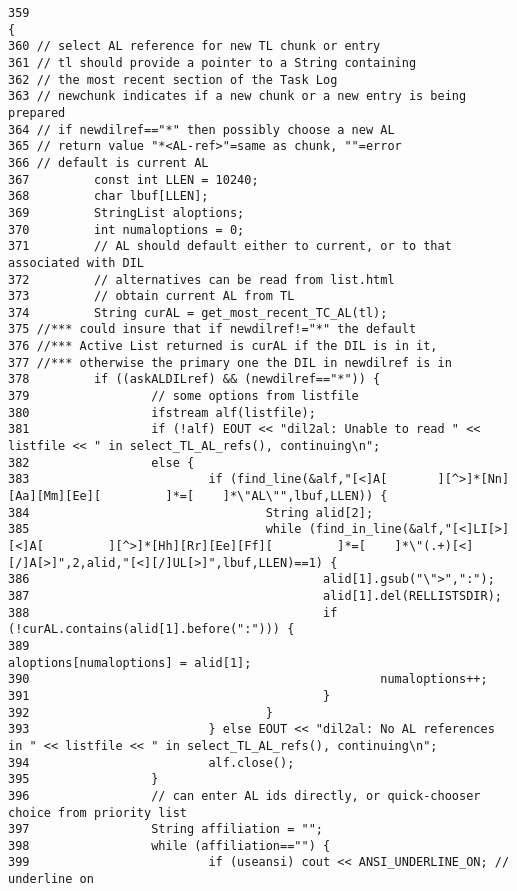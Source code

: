 \footnotesize\begin{verbatim}359                                                                        {
360 // select AL reference for new TL chunk or entry
361 // tl should provide a pointer to a String containing
362 // the most recent section of the Task Log
363 // newchunk indicates if a new chunk or a new entry is being prepared
364 // if newdilref=="*" then possibly choose a new AL
365 // return value "*<AL-ref>"=same as chunk, ""=error
366 // default is current AL
367         const int LLEN = 10240;
368         char lbuf[LLEN];
369         StringList aloptions;
370         int numaloptions = 0;
371         // AL should default either to current, or to that associated with DIL
372         // alternatives can be read from list.html
373         // obtain current AL from TL
374         String curAL = get_most_recent_TC_AL(tl);
375 //*** could insure that if newdilref!="*" the default
376 //*** Active List returned is curAL if the DIL is in it,
377 //*** otherwise the primary one the DIL in newdilref is in
378         if ((askALDILref) && (newdilref=="*")) {
379                 // some options from listfile
380                 ifstream alf(listfile);
381                 if (!alf) EOUT << "dil2al: Unable to read " << listfile << " in select_TL_AL_refs(), continuing\n";
382                 else {
383                         if (find_line(&alf,"[<]A[       ][^>]*[Nn][Aa][Mm][Ee][         ]*=[    ]*\"AL\"",lbuf,LLEN)) {
384                                 String alid[2];
385                                 while (find_in_line(&alf,"[<]LI[>][<]A[         ][^>]*[Hh][Rr][Ee][Ff][         ]*=[    ]*\"(.+)[<][/]A[>]",2,alid,"[<][/]UL[>]",lbuf,LLEN)==1) {
386                                         alid[1].gsub("\">",":");
387                                         alid[1].del(RELLISTSDIR);
388                                         if (!curAL.contains(alid[1].before(":"))) {
389                                                 aloptions[numaloptions] = alid[1];
390                                                 numaloptions++;
391                                         }
392                                 }
393                         } else EOUT << "dil2al: No AL references in " << listfile << " in select_TL_AL_refs(), continuing\n";
394                         alf.close();
395                 }
396                 // can enter AL ids directly, or quick-chooser choice from priority list
397                 String affiliation = "";
398                 while (affiliation=="") {
399                         if (useansi) cout << ANSI_UNDERLINE_ON; // underline on

\end{verbatim}
